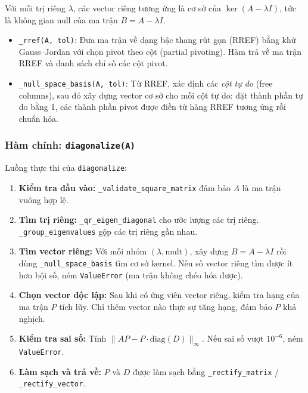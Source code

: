 Với mỗi trị riêng $\lambda$, các vector riêng tương ứng là cơ sở của $\ker(A - \lambda I)$, tức là không gian null của ma trận $B = A - \lambda I$.

\begin{itemize}
    \item \texttt{\_rref(A, tol)}: Đưa ma trận về dạng bậc thang rút gọn (RREF) bằng khử Gauss--Jordan với chọn pivot theo cột (partial pivoting). Hàm trả về ma trận RREF và danh sách chỉ số các cột pivot.
    \item \texttt{\_null\_space\_basis(A, tol)}: Từ RREF, xác định các \textit{cột tự do} (free columns), sau đó xây dựng vector cơ sở cho mỗi cột tự do: đặt thành phần tự do bằng 1, các thành phần pivot được điền từ hàng RREF tương ứng rồi chuẩn hóa.
\end{itemize}

\subsubsection{Hàm chính: \texttt{diagonalize(A)}}

Luồng thực thi của \texttt{diagonalize}:

\begin{enumerate}
    \item \textbf{Kiểm tra đầu vào:} \texttt{\_validate\_square\_matrix} đảm bảo $A$ là ma trận vuông hợp lệ.
    \item \textbf{Tìm trị riêng:} \texttt{\_qr\_eigen\_diagonal} cho ước lượng các trị riêng. \texttt{\_group\_eigenvalues} gộp các trị riêng gần nhau.
    \item \textbf{Tìm vector riêng:} Với mỗi nhóm $(\lambda, \text{mult})$, xây dựng $B = A - \lambda I$ rồi dùng \texttt{\_null\_space\_basis} tìm cơ sở kernel. Nếu số vector riêng tìm được ít hơn bội số, ném \texttt{ValueError} (ma trận không chéo hóa được).
    \item \textbf{Chọn vector độc lập:} Sau khi có ứng viên vector riêng, kiểm tra hạng của ma trận $P$ tích lũy. Chỉ thêm vector nào thực sự tăng hạng, đảm bảo $P$ khả nghịch.
    \item \textbf{Kiểm tra sai số:} Tính $\|AP - P \cdot \text{diag}(D)\|_\infty$. Nếu sai số vượt $10^{-6}$, ném \texttt{ValueError}.
    \item \textbf{Làm sạch và trả về:} $P$ và $D$ được làm sạch bằng \texttt{\_rectify\_matrix} / \texttt{\_rectify\_vector}.
\end{enumerate}

